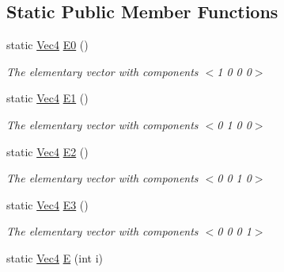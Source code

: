 \subsection*{Static Public Member Functions}
\begin{DoxyCompactItemize}
\item 
\hypertarget{classgfxmath_1_1_vec4_ab33520d34d2602f623c11594f5ed2f7d}{}static \hyperlink{classgfxmath_1_1_vec4}{Vec4} \hyperlink{classgfxmath_1_1_vec4_ab33520d34d2602f623c11594f5ed2f7d}{E0} ()\label{classgfxmath_1_1_vec4_ab33520d34d2602f623c11594f5ed2f7d}

\begin{DoxyCompactList}\small\item\em The elementary vector with components $<$1 0 0 0$>$ \end{DoxyCompactList}\item 
\hypertarget{classgfxmath_1_1_vec4_a8b088082a24053becfc32a669bba4e93}{}static \hyperlink{classgfxmath_1_1_vec4}{Vec4} \hyperlink{classgfxmath_1_1_vec4_a8b088082a24053becfc32a669bba4e93}{E1} ()\label{classgfxmath_1_1_vec4_a8b088082a24053becfc32a669bba4e93}

\begin{DoxyCompactList}\small\item\em The elementary vector with components $<$0 1 0 0$>$ \end{DoxyCompactList}\item 
\hypertarget{classgfxmath_1_1_vec4_a729213a952a975ba9c41538d136ec3f2}{}static \hyperlink{classgfxmath_1_1_vec4}{Vec4} \hyperlink{classgfxmath_1_1_vec4_a729213a952a975ba9c41538d136ec3f2}{E2} ()\label{classgfxmath_1_1_vec4_a729213a952a975ba9c41538d136ec3f2}

\begin{DoxyCompactList}\small\item\em The elementary vector with components $<$0 0 1 0$>$ \end{DoxyCompactList}\item 
\hypertarget{classgfxmath_1_1_vec4_aed404d6e82c29c918b47bb9f39b29ae2}{}static \hyperlink{classgfxmath_1_1_vec4}{Vec4} \hyperlink{classgfxmath_1_1_vec4_aed404d6e82c29c918b47bb9f39b29ae2}{E3} ()\label{classgfxmath_1_1_vec4_aed404d6e82c29c918b47bb9f39b29ae2}

\begin{DoxyCompactList}\small\item\em The elementary vector with components $<$0 0 0 1$>$ \end{DoxyCompactList}\item 
\hypertarget{classgfxmath_1_1_vec4_ad821eb6978366575d602aaa0bbe54c3c}{}static \hyperlink{classgfxmath_1_1_vec4}{Vec4} \hyperlink{classgfxmath_1_1_vec4_ad821eb6978366575d602aaa0bbe54c3c}{E} (int i)\label{classgfxmath_1_1_vec4_ad821eb6978366575d602aaa0bbe54c3c}


\end{DoxyCompactItemize}
